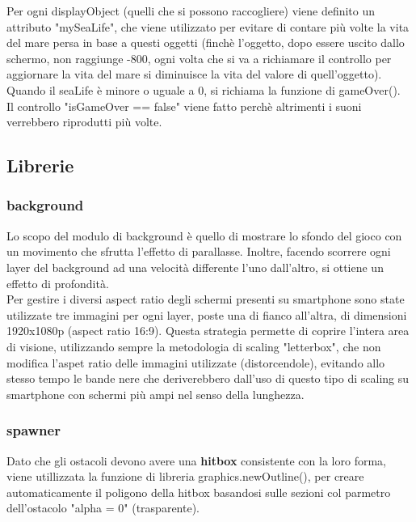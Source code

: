 \documentclass[15pt]{article}
\begin{document}
Per ogni displayObject (quelli che si possono raccogliere) viene definito un attributo "mySeaLife", che viene utilizzato per evitare di contare più volte la vita del mare persa in base a questi oggetti (finchè l'oggetto, dopo essere uscito dallo schermo, non raggiunge -800, ogni volta che si va a richiamare il controllo per aggiornare la vita del mare si diminuisce la vita del valore di quell'oggetto). Quando il seaLife è minore o uguale a 0, si richiama la funzione di gameOver().\\

Il controllo "isGameOver == false" viene fatto perchè altrimenti i suoni verrebbero riprodutti più volte.

\subsection{Librerie}
\subsubsection{background}
Lo scopo del modulo di background è quello di mostrare lo sfondo del gioco con un movimento che sfrutta l'effetto di parallasse. Inoltre, facendo scorrere ogni layer del background ad una velocità differente l'uno dall'altro, si ottiene un effetto di profondità.\\

Per gestire i diversi aspect ratio degli schermi presenti su smartphone sono state utilizzate tre immagini per ogni layer, poste una di fianco all'altra, di dimensioni 1920x1080p (aspect ratio 16:9). Questa strategia permette di coprire l'intera area di visione, utilizzando sempre la metodologia di scaling "letterbox", che non modifica l'aspet ratio delle immagini utilizzate (distorcendole), evitando allo stesso tempo le bande nere che deriverebbero dall'uso di questo tipo di scaling su smartphone con schermi più ampi nel senso della lunghezza.

\subsubsection{spawner}

Dato che gli ostacoli devono avere una \textbf{hitbox} consistente con la loro forma, viene utillizzata la funzione di libreria 
graphics.newOutline(), per creare automaticamente il poligono della hitbox basandosi sulle sezioni col parmetro dell'ostacolo "alpha = 0" (trasparente).
\\
\end{document}

